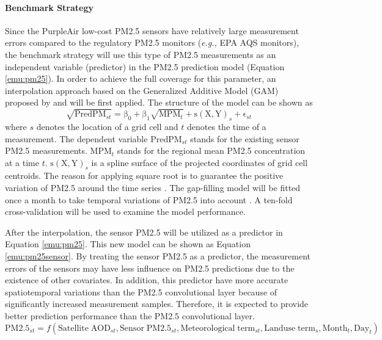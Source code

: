 \documentclass[11pt]{article}
\begin{document}
\paragraph{Benchmark Strategy}
Since the PurpleAir low-cost PM2.5 sensors have relatively large measurement errors compared to the regulatory PM2.5 monitors (\textit{e.g.,} EPA AQS monitors), the benchmark strategy will use this type of PM2.5 measurements as an independent variable (predictor) in the PM2.5 prediction model (Equation \ref{emu:pm25}). In order to achieve the full coverage for this parameter, an interpolation approach based on the Generalized Additive Model (GAM) proposed by \citet{Kloog2011} and \citet{Just2015} will be first applied. The structure of the model can be shown as
\begin{equation}
\label{emu:harvard}
\mathrm{
\sqrt{PredPM_\mathit{st}}=\beta_0+\beta_1 \sqrt{MPM_\mathit{t}}+s(X,Y)_\mathit{s}+\epsilon_\mathit{st}
}
\end{equation}
where $s$ denotes the location of a grid cell and $t$ denotes the time of a measurement. The dependent variable $\mathrm{PredPM_\mathit{st}}$ stands for the existing sensor PM2.5 measurements. $\mathrm{MPM_\mathit{t}}$ stands for the regional mean PM2.5 concentration at a time $t$. $\mathrm{s(X,Y)_\mathit{s}}$ is a spline surface of the projected coordinates of grid cell centroids. The reason for applying square root is to guarantee the positive variation of PM2.5 around the time series \citep{Just2015}. The gap-filling model will be fitted once a month to take temporal variations of PM2.5 into account \citep{Kloog2014}. A ten-fold cross-validation will be used to examine the model performance. 

After the interpolation, the sensor PM2.5 will be utilized as a predictor in Equation \ref{emu:pm25}. This new model can be shown as Equation \ref{emu:pm25sensor}. By treating the sensor PM2.5 as a predictor, the measurement errors of the sensors may have less influence on PM2.5 predictions due to the existence of other covariates. In addition, this predictor have more accurate spatiotemporal variations than the PM2.5 convolutional layer because of significantly increased measurement samples. Therefore, it is expected to provide better prediction performance than the PM2.5 convolutional layer. 
\begin{equation}
\label{emu:pm25sensor}
\mathrm{
PM2.5_{\mathit{st}}=\mathit{f}(Satellite\;AOD_{\mathit{st}},Sensor\;PM2.5_{\mathit{st}},Meteorological\;term_{\mathit{st}},Landuse\;term_\mathit{s},Month_\mathit{t}, Day_\mathit{t})
}
\end{equation}
\end{document}
